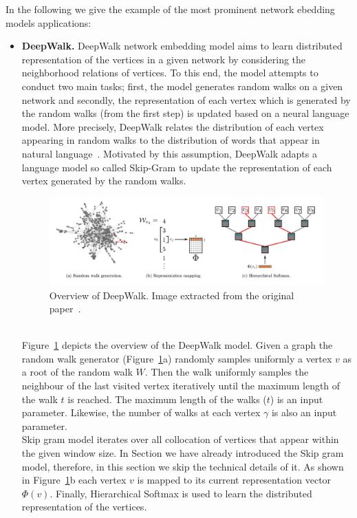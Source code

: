 In the following we give the example of the most prominent network ebedding models applications:
\begin{itemize}
\item \textbf{DeepWalk.}
DeepWalk network embedding model aims to learn distributed representation of the vertices in a given network by considering the neighborhood relations of vertices. To this end, the model attempts to conduct two main tasks; first, the model generates random walks on a given network and secondly, the representation of each vertex which is generated by the random walks (from the first step) is updated based on a neural language model. More precisely, DeepWalk relates the distribution of each vertex appearing in random walks to the distribution of words that appear in natural language~\cite{DBLP:journals/tkde/CuiWPZ19}. Motivated by this assumption, DeepWalk adapts a language model so called Skip-Gram to update the representation of each vertex generated by the random walks.
\begin{figure}[h]
 \includegraphics[width=\linewidth]{Figures/fig_deepwalk.png}
 \caption{Overview of DeepWalk. Image extracted from the original paper~\cite{}.}
 \label{fig:deepWalk}
\end{figure} \\
Figure~\ref{fig:deepWalk} depicts the overview of the DeepWalk model. Given a graph the random walk generator (Figure~\ref{fig:deepWalk}a) randomly samples uniformly a vertex $v$ as a root of the random walk $W$. Then the walk uniformly samples the neighbour of the last visited vertex iteratively until the maximum length of the walk $t$ is reached. The maximum length of the walks ($t$) is an input parameter. Likewise, the number of walks at each vertex $\gamma$ is also an input parameter.\\ 
Skip gram model iterates over all collocation of vertices that appear within the given window size. In Section we have already  introduced the Skip gram model, therefore, in this section we skip the technical details of it. As shown in Figure~\ref{fig:deepWalk}b each vertex $v$ is mapped to its current representation vector $\Phi(v)$. Finally, Hierarchical Softmax is used to learn the distributed representation of the vertices. \\
 

\end{itemize}

